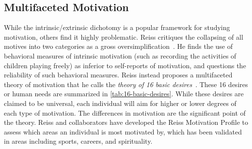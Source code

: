 \subsection{Multifaceted Motivation}

While the intrinsic/extrinsic dichotomy is a popular framework for studying motivation, others find it highly problematic. Reiss critiques the collapsing of all motives into two categories as a gross oversimplification~\cite{Reiss2012}. He finds the use of behavioral measures of intrinsic motivation (such as recording the activities of children playing freely) as inferior to self-reports of motivation, and questions the reliability of such behavioral measures. Reiss instead proposes a multifaceted theory of motivation that he calls the \emph{theory of 16 basic desires}~\cite{Reiss2004}. These 16 desires or human needs are summarized in \autoref{tab:16-basic-desires}. While these desires are claimed to be universal, each individual will aim for higher or lower degrees of each type of motivation. The differences in motivation are the significant point of the theory. Reiss and collaborators have developed the Reiss Motivation Profile to assess which areas an individual is most motivated by, which has been validated in areas including sports, careers, and spirituality.


